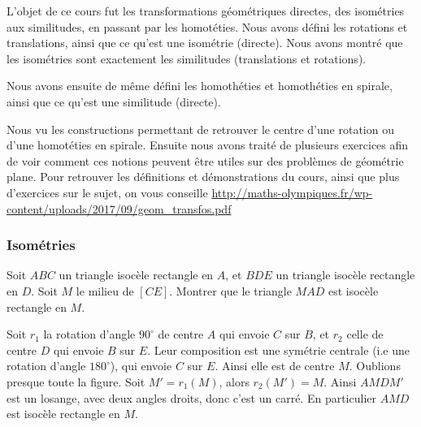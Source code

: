 
L'objet de ce cours fut les transformations géométriques directes, des isométries aux similitudes, en passant par les homotéties. Nous avons défini les rotations et translations, ainsi que ce qu'est une isométrie (directe). Nous avons montré que les isométries sont exactement les similitudes (translations et rotations).

\medskip

Nous avons ensuite de même défini les homothéties et homothéties en spirale, ainsi que ce qu'est une similitude (directe).

\medskip

Nous vu les constructions permettant de retrouver le centre d'une rotation ou d'une homotéties en spirale. Ensuite nous avons traité de plusieurs exercices afin de voir comment ces notions peuvent être utiles sur des problèmes de géométrie plane. Pour retrouver les définitions et démonstrations du cours, ainsi que plus d'exercices sur le sujet, on vous conseille \href{le cours de la POFM sur le sujet.}{http://maths-olympiques.fr/wp-content/uploads/2017/09/geom\_transfos.pdf}

\subsubsection{Isométries}

\begin{exo}
Soit $ABC$ un triangle isocèle rectangle en $A$, et $BDE$ un triangle isocèle rectangle en $D$. Soit $M$ le milieu de $[CE]$. Montrer que le triangle $MAD$ est isocèle rectangle en $M$.
\end{exo}

\begin{sol}
Soit $r_1$ la rotation d'angle $90^\circ$ de centre $A$ qui envoie $C$ sur $B$, et $r_2$ celle de centre $D$ qui envoie $B$ sur $E$. Leur composition est une symétrie centrale (i.e une rotation d'angle $180^\circ$), qui envoie $C$ sur $E$. Ainsi elle est de centre $M$.
Oublions presque toute la figure. Soit $M'=r_1(M)$, alors $r_2(M')=M$. Ainsi $AMDM'$ est un losange, avec deux angles droits, donc c'est un carré. En particulier $AMD$ est isocèle rectangle en $M$.

\end{sol}

